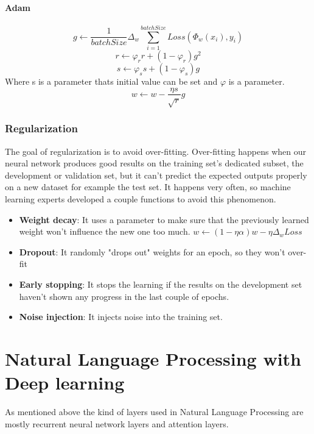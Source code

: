 \paragraph*{Adam}
\[g \leftarrow \frac{1}{batchSize}\Delta_w \sum_{i=1}^{batchSize}Loss(\Phi_w(x_i), y_i)\]
\[r \leftarrow \varphi_r r + (1 - \varphi_r) g^2\]
\[s \leftarrow \varphi_s s + (1 - \varphi_s) g\]
Where s is a parameter thats initial value can be set and \(\varphi\) is a parameter.
\[w \leftarrow w - \frac{\eta s}{\sqrt{r}} g\]

\subsubsection{Regularization}
The goal of regularization is to avoid over-fitting. Over-fitting happens when our neural network produces good results on the training set's dedicated subset, the development or validation set, but it can't predict the expected outputs properly on a new dataset for example the test set. It happens very often, so machine learning experts developed a couple functions to avoid this phenomenon.
\begin{itemize}
	\item \textbf{Weight decay}: It uses a parameter to make sure that the previously learned weight won't influence the new one too much. \(w \leftarrow (1 - \eta \alpha)w - \eta \Delta_w Loss\)
	\item \textbf{Dropout}: It randomly "drops out" weights for an epoch, so they won't over-fit
	\item \textbf{Early stopping}: It stops the learning if the results on the development set haven't shown any progress in the last couple of epochs.
	\item \textbf{Noise injection}: It injects noise into the training set.
\end{itemize}

\section{Natural Language Processing with Deep learning}
As mentioned above the kind of layers used in Natural Language Processing are mostly recurrent neural network layers and attention layers.
